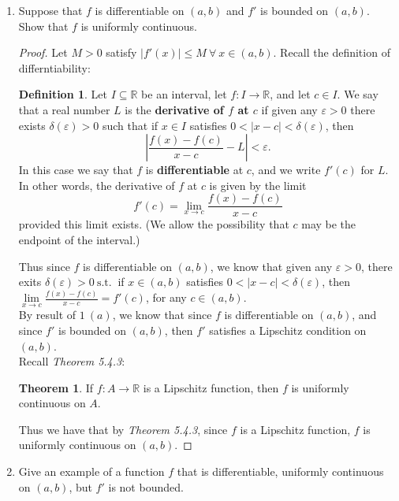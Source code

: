 \documentclass[12pt,letterpaper]{article}
\newcommand{\st}{\ \text{s.t.}\ }
\newcommand{\abs}[1]{\left\lvert #1 \right\rvert}
\newcommand{\R}{\mathbb{R}}
\theoremstyle{case}
\theoremstyle{definition}
\newtheorem{definition*}{Definition}
\newtheorem{theorem*}{Theorem}
\begin{document}
\begin{enumerate}
\begin{enumerate}
			\item Suppose that $f$ is differentiable on $(a,b)$ and $f'$ is bounded on $(a,b)$. Show that $f$ is uniformly continuous.
			
			\begin{proof}
				Let $M>0$ satisfy $|f'(x)| \leq M\ \forall\ x \in (a,b)$. Recall the definition of differntiability:
				\theoremstyle{definition}
				\begin{definition*}
					Let $I \subseteq \R$ be an interval, let $f:I \rightarrow \R$, and let $ c \in I$. We say that a real number $L$ is the \textbf{derivative of $f$ at $c$}  if given any $\varepsilon > 0$ there exists $\delta (\varepsilon) > 0$ such that if $x \in I$ satisfies $0 < |x-c|<\delta (\varepsilon)$, then
					\[\abs{\frac{f(x)-f(c)}{x-c}-L}<\varepsilon.\]
					In this case we say that $f$ is \textbf{differentiable} at $c$, and we write $f'(c)$ for $L$. In other words, the derivative of $f$ at $c$ is given by the limit
					\[f'(c) = \lim\limits_{x\to c} \frac{f(x)-f(c)}{x-c}\]
					provided this limit exists. (We allow the possibility that $c$ may be the endpoint of the interval.)
				\end{definition*}
				Thus since $f$ is differentiable on $(a,b)$, we know that given any $\varepsilon>0$, there exits $\delta(\varepsilon) >0 \st$ if $x \in (a,b)$ satisfies $0<|x-c|<\delta(\varepsilon)$, then $\lim\limits_{x \to c} \frac{f(x)-f(c)}{x-c} = f'(c)$, for any $c \in (a,b)$.\\
				
				By result of $1\ (a)$, we know that since $f$ is differentiable on $(a,b)$, and since $f'$ is bounded on $(a,b)$, then $f'$ satisfies a Lipschitz condition on $(a,b)$.\\
				
				Recall \textit{Theorem 5.4.3}:
				\begin{theorem*}
					If $f:A \rightarrow \R$ is a Lipschitz function, then $f$ is uniformly continuous on $A$.
				\end{theorem*}
				Thus we have that by \textit{Theorem 5.4.3}, since $f$ is a Lipschitz function, $f$ is uniformly continuous on $(a,b)$.
			\end{proof}
			
			\item Give an example of a function $f$ that is differentiable, uniformly continuous on $(a,b)$, but $f'$ is not bounded.\\
			

\end{enumerate}
\end{enumerate}
\end{document}
